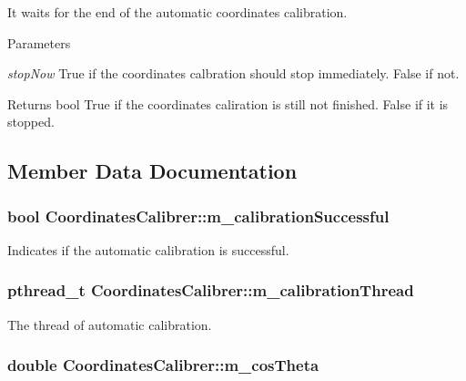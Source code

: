 It waits for the end of the automatic coordinates calibration. 


\begin{DoxyParams}{Parameters}
\item[{\em stopNow}]True if the coordinates calbration should stop immediately. False if not. \end{DoxyParams}
\begin{DoxyReturn}{Returns}
bool True if the coordinates caliration is still not finished. False if it is stopped. 
\end{DoxyReturn}


\subsection{Member Data Documentation}
\hypertarget{classCoordinatesCalibrer_aade3d6c933ebb71c197061828ca6b951}{
\subsubsection[{m\_\-calibrationSuccessful}]{\setlength{\rightskip}{0pt plus 5cm}bool {\bf CoordinatesCalibrer::m\_\-calibrationSuccessful}}}
\label{classCoordinatesCalibrer_aade3d6c933ebb71c197061828ca6b951}
Indicates if the automatic calibration is successful. \hypertarget{classCoordinatesCalibrer_aa2b792c4284dc94338c9acbd26ea2c3a}{
\subsubsection[{m\_\-calibrationThread}]{\setlength{\rightskip}{0pt plus 5cm}pthread\_\-t {\bf CoordinatesCalibrer::m\_\-calibrationThread}}}
\label{classCoordinatesCalibrer_aa2b792c4284dc94338c9acbd26ea2c3a}
The thread of automatic calibration. \hypertarget{classCoordinatesCalibrer_a0fd71c87e90fc61802942e22c9584fb9}{
\subsubsection[{m\_\-cosTheta}]{\setlength{\rightskip}{0pt plus 5cm}double {\bf CoordinatesCalibrer::m\_\-cosTheta}}}
